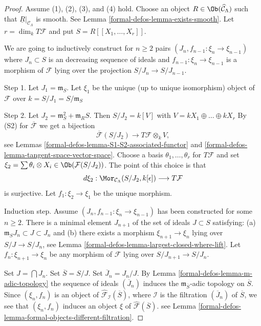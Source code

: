 \begin{proof}
Assume (1), (2), (3), and (4) hold. Choose an object
$R \in \Ob(\widehat{\mathcal{C}}_\Lambda)$
such that $\underline{R}|_{\mathcal{C}_\Lambda}$ is smooth.
See Lemma \ref{formal-defos-lemma-exists-smooth}.
Let $r = \dim_k T\mathcal{F}$ and put $S = R[[X_1, \ldots, X_r]]$.

\medskip\noindent
We are going to inductively construct for $n \geq 2$ pairs
$(J_n, f_{n - 1} : \xi_n \to \xi_{n - 1})$
where $J_n \subset S$ is an decreasing sequence of ideals and
$f_{n - 1} : \xi_n \to \xi_{n - 1}$ is a morphism of
$\mathcal{F}$ lying over the projection $S/J_n \to S/J_{n - 1}$.

\medskip\noindent
Step 1. Let $J_1 = \mathfrak m_S$. Let $\xi_1$ be the unique
(up to unique isomorphism) object of $\mathcal{F}$ over
$k = S/J_1 = S/\mathfrak m_S$

\medskip\noindent
Step 2. Let
$J_2 = \mathfrak m_S^2 + \mathfrak{m}_R S$. Then
$S/J_2 = k[V]$ with $V = kX_1 \oplus \ldots \oplus kX_r$
By (S2) for $\overline{\mathcal{F}}$ we get a bijection
$$
\overline{\mathcal{F}}(S/J_2)
\longrightarrow
T\mathcal{F} \otimes_k V,
$$
see
Lemmas \ref{formal-defos-lemma-S1-S2-associated-functor} and
\ref{formal-defos-lemma-tangent-space-vector-space}.
Choose a basis $\theta_1, \ldots, \theta_r$ for $T\mathcal{F}$ and set
$\xi_2 = \sum \theta_i \otimes X_i \in \Ob(\mathcal{F}(S/J_2))$.
The point of this choice is that
$$
d\xi_2 :
\Mor_{\mathcal{C}_\Lambda}(S/J_2, k[\epsilon])
\longrightarrow
T\mathcal{F}
$$
is surjective. Let $f_1 : \xi_2 \to \xi_1$ be the unique morphism.

\medskip\noindent
Induction step. Assume $(J_n, f_{n - 1} : \xi_n \to \xi_{n - 1})$ has been
constructed for some $n \geq 2$. There is a minimal element $J_{n + 1}$ of
the set of ideals $J \subset S$ satisfying:
(a) $\mathfrak m_S J_n \subset J \subset J_n$ and
(b) there exists a morphism $\xi_{n + 1} \to \xi_n$ lying over
$S/J \to S/J_n$, see
Lemma \ref{formal-defos-lemma-largest-closed-where-lift}.
Let $f_n : \xi_{n + 1} \to \xi_n$ be any morphism of $\mathcal{F}$
lying over $S/J_{n + 1} \to S/J_n$.

\medskip\noindent
Set $J = \bigcap J_n$. Set $\overline{S} = S/J$. Set $\overline{J}_n = J_n/J$.
By
Lemma \ref{formal-defos-lemma-m-adic-topology}
the sequence of ideals $(\overline{J}_n)$ induces the
$\mathfrak m_{\overline{S}}$-adic topology on $\overline{S}$.
Since $(\xi_n, f_n)$ is an object of
$\widehat{\mathcal{F}}_\mathcal{I}(\overline{S})$, where $\mathcal{I}$
is the filtration $(\overline{J}_n)$ of $\overline{S}$,
we see that $(\xi_n, f_n)$
induces an object $\xi$ of $\widehat{\mathcal{F}}(\overline{S})$.
see
Lemma \ref{formal-defos-lemma-formal-objects-different-filtration}.


\end{proof}

